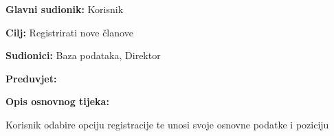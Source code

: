 				\noindent {}
				\begin{packed_item}
					
					\item \textbf{Glavni sudionik:} Korisnik
					\item  \textbf{Cilj:} Registrirati nove članove
					\item  \textbf{Sudionici:} Baza podataka, Direktor
					\item  \textbf{Preduvjet:} 
					\item  \textbf{Opis osnovnog tijeka:}
					
					\item[] \begin{packed_enum}
						
						\item Korisnik odabire opciju registracije te unosi svoje osnovne podatke i poziciju
						
					\end{packed_enum}
					
				\end{packed_item}
				
